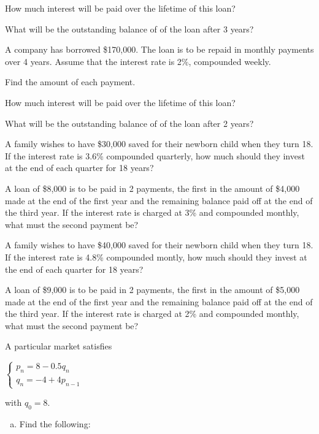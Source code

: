 \documentclass[12pt,legalpaper]{exam}
\newcommand{\p}{\noindent}
\newcommand{\vsp}{\vspace{0.5cm}}
\begin{document}
\begin{questions}
\begin{compactenum}[(a)]
\item How much interest will be paid over the lifetime of this loan?
\vspace{8cm}

\item What will be the outstanding balance of of the loan after 3 years?
\end{compactenum}
\newpage

\question[4] A company has borrowed \$170,000.  The loan is to be repaid in monthly payments over 4 years.  Assume that the interest rate is 2\%, compounded weekly.
\begin{compactenum}[(a)]
\item Find the amount of each payment.
\vspace{10cm}

\item How much interest will be paid over the lifetime of this loan?
\vspace{8cm}

\item What will be the outstanding balance of of the loan after 2 years?
\end{compactenum}
\newpage

\question[3] A family wishes to have \$30,000 saved for their newborn child when they turn 18.  If the interest rate is 3.6\% compounded quarterly, how much should they invest at the end of each quarter for 18 years?
\vspace{13cm}

\question[3] A loan of \$8,000 is to be paid in 2 payments, the first in the amount of \$4,000 made at the end of the first year and the remaining balance paid off at the end of the third year.  If the interest rate is charged at 3\% and compounded monthly, what must the second payment be?
\newpage

\question[3] A family wishes to have \$40,000 saved for their newborn child when they turn 18.  If the interest rate is 4.8\% compounded montly, how much should they invest at the end of each quarter for 18 years?
\vspace{13cm}

\question[3] A loan of \$9,000 is to be paid in 2 payments, the first in the amount of \$5,000 made at the end of the first year and the remaining balance paid off at the end of the third year.  If the interest rate is charged at 2\% and compounded monthly, what must the second payment be?
\newpage

\question[7] A particular market satisfies
\begin{center}
$\begin{cases}p_{n} = 8 - 0.5q_{n}\\q_{n} = -4 + 4p_{n-1}\end{cases}$
\end{center}
\p with $q_{0} = 8$.
\vsp
\begin{enumerate}[(a)]
\item Find the following:
\vsp


\end{enumerate}
\end{questions}
\end{document}
